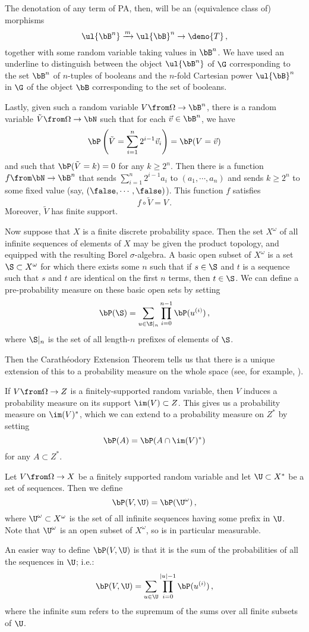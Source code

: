 The denotation of any term of PA, then, will be an (equivalence class of) morphisms
\[
  \ul{\bB^n} \xrightarrow{m} \ul{\bB}^n \to \deno{T}\,,
  \]
together with some random variable taking values in $\bB^n$.
We have used an underline to distinguish between the object $\ul{\bB^n}$ of $\G$ corresponding to the set $\bB^n$ of $n$-tuples of booleans and the $n$-fold Cartesian power $\ul{\bB}^n$ in $\G$ of the object $\bB$ corresponding to the set of booleans.

Lastly, given such a random variable $V\from\Omega \to \bB^n$, there is a random variable $\tilde{V} \from \Omega \to \bN$ such that for each $\vec{v}\in\bB^n$, we have
\[
  \bP\left(\tilde{V} = \sum_{i=1}^n 2^{i-1}\vec{v}_i\right) = \bP(V = \vec{v})
  \]
and such that $\bP(\tilde{V}=k)=0$ for any $k\ge 2^n$.
Then there is a function $f \from \bN \to \bB^n$ that sends $\sum_{i=1}^n 2^{i-1}a_i$ to $(a_1,\cdots,a_n)$ and sends $k\ge 2^n$ to some fixed value (say, $(\false,\cdots,\false)$).  
This function $f$ satisfies
\[
  f\circ\tilde{V}=V\,.
  \]
Moreover, $\tilde{V}$ has finite support.

Now suppose that $X$ is a finite discrete probability space.  
Then the set $X^\omega$ of all infinite sequences of elements of $X$ may be given the product topology, and equipped with the resulting Borel $\sigma$-algebra.  
A basic open subset of $X^\omega$ is a set $\S\subset X^\omega$ for which there exists some $n$ such that if $s\in \S$ and $t$ is a sequence such that $s$ and $t$ are identical on the first $n$ terms, then $t\in\S$.
We can define a pre-probability measure on these basic open sets by setting
\[
  \bP(\S) = \sum_{u\in \S\vert_n} \prod_{i=0}^{n-1} \bP(u^{(i)})\,,
  \]
where $\S\vert_n$ is the set of all length-$n$ prefixes of elements of $\S$.

Then the Carath\'{e}odory Extension Theorem tells us that there is a unique extension of this to a probability measure on the whole space (see, for example, \cite[1.1.4]{StochasticCalculusII}).

If $V \from \Omega \to Z$ is a finitely-supported random variable, then $V$ induces a probability measure on its support $\im(V)\subset Z$.
This gives us a probability measure on $\im(V)^*$, which we can extend to a probability measure on $Z^*$ by setting
\[
  \bP(A) = \bP(A \cap \im(V)^*)
  \]
for any $A \subset Z^*$.

\begin{definition}
  Let $V\from \Omega \to X$ be a finitely supported random variable and let $\U\subset X^*$ be a set of sequences.  
  Then we define
  \[
    \bP(V,\U) = \bP(\U^\omega)\,,
    \]
  where $\U^\omega\subset X^\omega$ is the set of all infinite sequences having some prefix in $\U$.
  Note that $\U^\omega$ is an open subset of $X^\omega$, so is in particular measurable.

  An easier way to define $\bP(V,\U)$ is that it is the sum of the probabilities of all the sequences in $\U$; i.e.:
  \[
    \bP(V,\U) = \sum_{u\in \U} \prod_{i=0}^{|u|-1} \bP(u^{(i)})\,,
    \]
  where the infinite sum refers to the supremum of the sums over all finite subsets of $\U$.
\end{definition}

